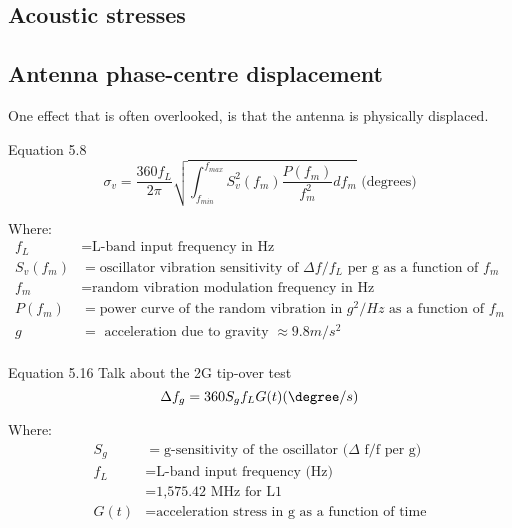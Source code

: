 \subsection{Acoustic stresses}


\subsection{Antenna phase-centre displacement}
One effect that is often overlooked, is that the antenna is physically displaced.


Equation 5.8
\begin{equation}
\sigma_v = \frac{360f_L}{2\pi}\sqrt{\int_{f_{min}}^{f_{max}} S^2_v(f_m) \frac{P(f_m)}{f^2_m} df_m}\text{ (degrees)}
\end{equation}

Where:
\begin{align*}
f_L &= \text{L-band input frequency in Hz} \\
S_v(f_m) &= \text{oscillator vibration sensitivity of } \Delta f/f_L \text{ per g as a function of } f_m \\
f_m &= \text{random vibration modulation frequency in Hz} \\
P(f_m) &= \text{power curve of the random vibration in } g^2/Hz \text{ as a function of } f_m \\
g &= \text{ acceleration due to gravity } \approx 9.8 m/s^2\\
\end{align*}


Equation 5.16
Talk about the 2G tip-over test
\begin{equation}
\Delta f_g = 360 S_g f_L G(t) (\degree/s)
\end{equation}

Where:
\begin{align*}
S_g &= \text{g-sensitivity of the oscillator } (\Delta \text{ f/f per g)}\\ 
f_L &= \text{L-band input frequency (Hz)}\\
&= \text{1,575.42 MHz for L1}\\
G(t) &= \text{acceleration stress in g as a function of time}
\end{align*}


